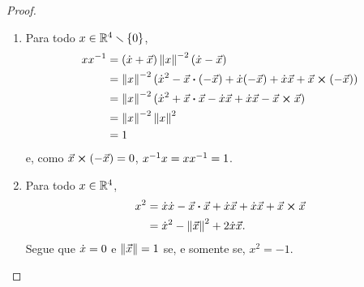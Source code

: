 \begin{proof}
\begin{enumerate}
	\item Para todo $x \in \mathbb{R}^4 \smallsetminus \{0\}$,
	\begin{align*}
	xx^{-1} &= (\dot{x}+\vec{x})\left\Vert{x}\right\Vert^{-2}(\dot{x}-\vec{x}) \\
		&= \left\Vert{x}\right\Vert^{-2}(\dot{x}^2-{\vec{x}} \bm{\cdot} {(-\vec{x})}+\dot{x}(-\vec{x})+\dot{x}\vec{x}+{\vec{x}} \bm{\times} {(-\vec{x})}) \\
		&= \left\Vert{x}\right\Vert^{-2}(\dot{x}^2+{\vec{x}} \bm{\cdot} {\vec{x}}-\dot{x}\vec{x}+\dot{x}\vec{x}-{\vec{x}} \bm{\times} {\vec{x}}) \\
		&= \left\Vert{x}\right\Vert^{-2}\left\Vert{x}\right\Vert^2 \\
		&= 1
	\end{align*}
e, como ${\vec{x}} \bm{\times} {(-\vec{x})} = 0$, $x^{-1} x = xx^{-1} = 1$.

	\item Para todo $x \in \mathbb{R}^4$,
		\begin{align*}
		x^2 &= \dot{x}\dot{x} - {\vec{x}} \bm{\cdot} {\vec{x}}+\dot{x}\vec{x}+\dot{x}\vec{x}+{\vec{x}} \bm{\times} {\vec{x}} \\
			&= \dot{x}^2 - \left\Vert{\vec{x}}\right\Vert^2 + 2\dot{x}\vec{x}.
		\end{align*}
Segue que $\dot{x}=0$ e $\left\Vert{\vec{x}}\right\Vert=1$ se, e somente se, $x^2=-1$. \qedhere
\end{enumerate}
\end{proof}



